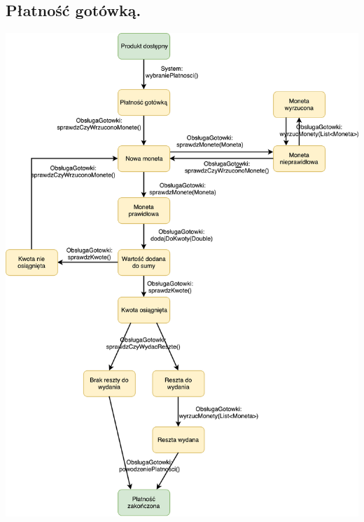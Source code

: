 \documentclass[11pt]{article}
\begin{document}
		\subsection{Płatność gotówką.}
		\begin{center}
			\includegraphics[scale=0.65]{stanu3.pdf}
		\end{center}
		\newpage
\end{document}

